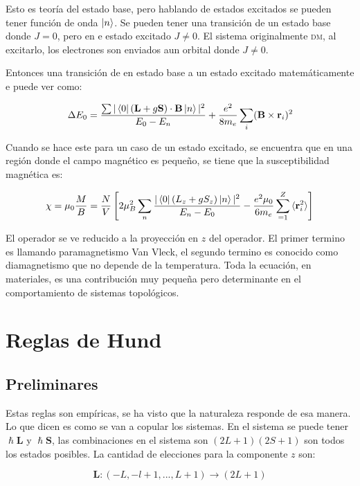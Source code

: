\documentclass[11pt,fleqn]{book}
\renewcommand{\vec}[1]{\mathbf{#1}}
\begin{document}
Esto es teoría del estado base, pero hablando de estados excitados se pueden tener función de onda $\ket{n}$. Se pueden tener una transición de un estado base donde $J=0$, pero en e estado excitado $J\neq 0$. El sistema originalmente \textsc{dm}, al excitarlo, los electrones son enviados aun orbital donde $J\neq 0$. 




Entonces una transición de en estado base a un estado excitado matemáticamente e puede ver como:

\begin{equation}
    \Delta E_{0}=\frac{\sum |\bra{0}(\vec{L}+g\vec{S})\cdot\vec{B}\ket{n}|^{2}}{E_{0}-E_{n}}+\frac{e^{2}}{8m_{e}}\sum_{i}(\vec{B}\times\vec{r}_{i})^{2}
    \label{Eq. 3.33}
\end{equation}

Cuando se hace este para un caso de un estado excitado, se encuentra que en una región donde el campo magnético es pequeño, se tiene que la susceptibilidad magnética es:

\begin{equation*}
    \chi=\mu_{0}\frac{M}{B}=\frac{N}{V}\left[2\mu_{B}^{2}\sum_{n}\frac{|\bra{0}(L_{z}+gS_{z})\ket{n}|^{2}}{E_{n}-E_{0}}-\frac{e^{2}\mu_{0}}{6m_{e}}\sum_{=1}^{Z}\braket{\vec{r}_{i}^{2}}\right]
\end{equation*}

El operador se ve reducido a la proyección en $z$ del operador. El primer termino es llamando paramagnetismo Van Vleck, el segundo termino es conocido como diamagnetismo que no depende de la temperatura. Toda la ecuación, en materiales, es una contribución muy pequeña pero determinante en el comportamiento de sistemas topológicos. 

\section{Reglas de Hund}
\subsection{Preliminares}

Estas reglas son empíricas, se ha visto que la naturaleza responde de esa manera. Lo que dicen es como se van a copular los sistemas. En el sistema se puede tener $\hslash\vec{L}$ y $\hslash\vec{S}$, las combinaciones en el sistema son $(2L+1)(2S+1)$ son todos los estados posibles. La cantidad de elecciones para la componente $z$ son:

\begin{equation*}
    \vec{L}:(-L,-l+1,...,L+1)\longrightarrow (2L+1)
\end{equation*}
\end{document}
